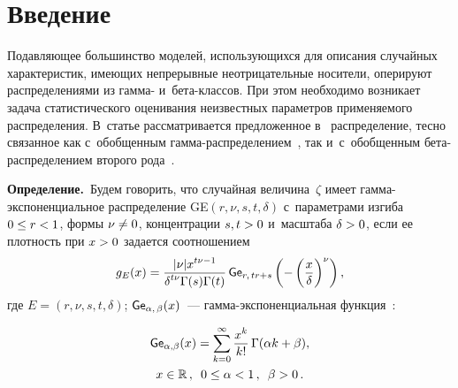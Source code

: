 

  
\vspace*{2pt}



\thispagestyle{headings}

\begin{multicols}{2}

\label{st\stat}

\section{Введение}


Подавляющее большинство моделей, ис\-поль\-зу\-ющих\-ся для описания случайных 
характеристик, име\-ющих непрерывные не\-от\-ри\-ца\-тель\-ные носители, оперируют 
распределениями из гамма- и~бета-клас\-сов. При этом необходимо возникает задача 
ста\-ти\-сти\-че\-ско\-го оценивания неизвестных па\-ра\-мет\-ров при\-ме\-ня\-емо\-го распределения. 
В~статье рас\-смат\-ри\-ва\-ет\-ся предложенное в~\cite{Ku2019_2} распределение, тес\-но 
связанное как с~обобщенным гам\-ма-рас\-пре\-де\-ле\-ни\-ем~\cite{KrMe1946,KrMe1948}, так 
и~с~обобщенным бе\-та-рас\-пре\-де\-ле\-ни\-ем второго рода~\cite{McDonald1984}.

\smallskip

\noindent
\textbf{Определение.}\ 
Будем говорить, что случайная величина~$\zeta$ имеет гам\-ма-экс\-по\-нен\-ци\-аль\-ное 
распределение GE$(r,\nu,s,t,\delta)$ с~па\-ра\-мет\-ра\-ми изгиба $0\hm\le r\hm<1$, формы 
$\nu\hm\neq0$, концентрации $s,t\hm>0$ и~мас\-шта\-ба $\delta\hm>0$, если ее плот\-ность при 
$x\hm>0$ задается со\-от\-но\-ше\-нием
\begin{equation}
\label{GED}
g_E(x) =
\displaystyle\frac{\displaystyle |\nu|x^{t\nu-1}\mathstrut}{\displaystyle \delta^{t\nu}\Gamma(s)\Gamma(t)\mathstrut}
   \,{\sf Ge}_{r,\, tr+s}\left(-\left(\displaystyle\frac{\displaystyle x\mathstrut}{\displaystyle \delta\mathstrut} \right)^{\nu}\right),
\end{equation}
где $E=(r,\nu,s,t,\delta)$; ${\sf Ge}_{\alpha,\, \beta} (x)$~--- гамма-экс\-по\-нен\-ци\-аль\-ная функция~\cite{KuTi2017}:

\noindent
\begin{multline}
\label{GEF}
{\sf Ge}_{\alpha, \beta} (x) = 
\sum\limits_{k=0}^{\infty}\displaystyle\frac{\displaystyle x^k\mathstrut}{\displaystyle k!\mathstrut}\, \Gamma(\alpha k + \beta), \\
 x\in\mathbb{R}\,, \enskip 0\le\alpha<1\,, \enskip \beta> 0\,.
\end{multline}


\end{multicols}
